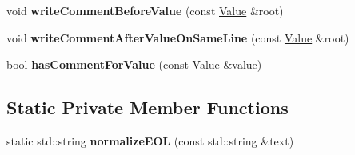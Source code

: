 \begin{DoxyCompactItemize}
\item 
\hypertarget{class_json_1_1_styled_writer_ad3452c48fabf968bf3693549331ec06e}{}void {\bfseries write\+Comment\+Before\+Value} (const \hyperlink{class_json_1_1_value}{Value} \&root)\label{class_json_1_1_styled_writer_ad3452c48fabf968bf3693549331ec06e}

\item 
\hypertarget{class_json_1_1_styled_writer_ab12b274c62822fc51ec4617c6be95139}{}void {\bfseries write\+Comment\+After\+Value\+On\+Same\+Line} (const \hyperlink{class_json_1_1_value}{Value} \&root)\label{class_json_1_1_styled_writer_ab12b274c62822fc51ec4617c6be95139}

\item 
\hypertarget{class_json_1_1_styled_writer_a37a806d010f708cb68556f2666f79bdf}{}bool {\bfseries has\+Comment\+For\+Value} (const \hyperlink{class_json_1_1_value}{Value} \&value)\label{class_json_1_1_styled_writer_a37a806d010f708cb68556f2666f79bdf}

\end{DoxyCompactItemize}
\subsection*{Static Private Member Functions}
\begin{DoxyCompactItemize}
\item 
\hypertarget{class_json_1_1_styled_writer_ad9444449eecf1581f7d227a0b50ecc4d}{}static std\+::string {\bfseries normalize\+E\+O\+L} (const std\+::string \&text)\label{class_json_1_1_styled_writer_ad9444449eecf1581f7d227a0b50ecc4d}

\end{DoxyCompactItemize}
